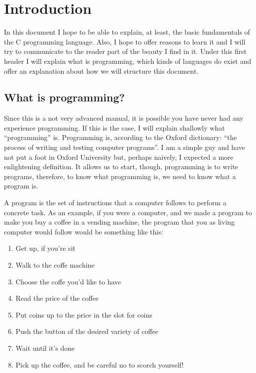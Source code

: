 \documentclass[a4paper]{article}
\begin{document}
\section{Introduction}
In this document I hope to be able to explain, at least, the basic fundamentals
of the C programming language. Also, I hope to offer reasons to learn it and
I will try to communicate to the reader part of the beauty I find in it.
Under this first header I will explain what is programming, which kinds
of languages do exist and offer an explanation about how we will structure this
document.

\label{section:queEsLaProgramacion}
\subsection{What is programming?}
Since this is a not very advanced manual, it is possible you have never had any
experience programming. If this is the case, I will explain shallowly what
``programming'' is. Programming is, according to the Oxford dictionary: ``the
process of writing and testing computer programs''. I am a simple guy and
have not put a foot in Oxford University but, perhaps naively, I expected a more
enlightening definition. It allows us to start, though, programming is to write
programs, therefore, to know what programming is, we need to know what a program
is.

A program is the set of instructions that a computer follows to perform a
concrete task. As an example, if you were a computer, and we made a program to
make you buy a coffee in a vending machine, the program that you as living
computer would follow would be something like this:

\begin{enumerate}
    \item Get up, if you're sit
    \item Walk to the coffe machine
    \item Choose the coffe you'd like to have
    \item Read the price of the coffee
    \item Put coins up to the price in the slot for coins
    \item Push the button of the desired variety of coffee
    \item Wait until it's done
    \item Pick up the coffee, and be careful no to scorch yourself!
\end{enumerate}
\end{document}
